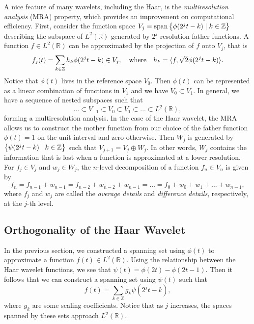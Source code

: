 \documentclass{article}
\DeclarePairedDelimiter{\iprod}{\langle}{\rangle}
\def\RR{\mathbb{R}}
\def\ZZ{\mathbb{Z}}
\DeclareMathOperator{\spans}{span}
\theoremstyle{definition}
\begin{document}
  A nice feature of many wavelets, including the Haar, is the \textit{multiresolution analysis} (MRA) property, which provides an improvement on computational efficiency. First, consider the function space \(V_j = \spans\qty{\phi(2^jt-k) \mid k \in \ZZ}\) describing the subspace of \(L^2(\mathbb{R})\) generated by \(2^j\) resolution father functions. A function \(f \in L^2(\RR)\) can be approximated by the projection of \(f\) onto \(V_j\), that is
  \begin{equation} \label{eqn:proj-f-onto-vj}
    f_j(t) = \sum_{k \in \ZZ} h_k \phi(2^jt-k) \in V_j, 
    \qq{where}
    h_k = \iprod{f,\sqrt{2}\phi(2^jt-k)}.
  \end{equation}
  Notice that \(\phi(t)\) lives in the reference space \(V_0\). Then \(\phi(t)\) can be represented as a linear combination of functions in \(V_1\) and we have \(V_0 \subset V_1\). In general, we have a sequence of nested subspaces such that
  \begin{equation} \label{eqn:mra}
    \dots \subset V_{-1} \subset V_0 \subset V_1 \subset \dots \subset L^2(\mathbb{R}),
  \end{equation}
  forming a multiresolution analysis. In the case of the Haar wavelet, the MRA allows us to construct the mother function from our choice of the father function \(\phi(t) = 1\) on the unit interval and zero otherwise. Then \(W_j\) is generated by \(\qty{\psi(2^jt-k) \mid k \in \ZZ}\) such that \(V_{j+1} = V_j \oplus W_j\). In other words, \(W_j\) contains the information that is lost when a function is approximated at a lower resolution. For \(f_j \in V_j\) and \(w_j \in W_j\), the \(n\)-level decomposition of a function \(f_n \in V_n\) is given by
  \[f_n = f_{n-1} + w_{n-1} = f_{n-2} + w_{n-2} + w_{n-1} = \dots = f_0 + w_0 + w_1 + \dots + w_{n-1},\]
  where \(f_j\) and \(w_j\) are called the \textit{average details} and \textit{difference details}, respectively, at the \(j\)-th level.

  \subsection{Orthogonality of the Haar Wavelet}

  In the previous section, we constructed a spanning set using \(\phi(t)\) to approximate a function \(f(t) \in L^2(\RR)\). Using the relationship between the Haar wavelet functions, we see that \(\psi(t) = \phi(2t) - \phi(2t-1)\). Then it follows that we can construct a spanning set using \(\psi(t)\) such that
  \begin{equation} \label{eqn:proj-f-onto-wj}
    f(t) = \sum_{k \in \ZZ} g_k \psi(2^jt-k),
  \end{equation}
  where \(g_k\) are some scaling coefficients. Notice that as \(j\) increases, the spaces spanned by these sets approach \(L^2(\RR)\).
\end{document}

